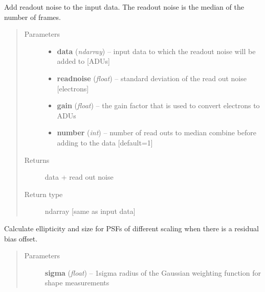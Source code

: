 \documentclass[a4paper,12pt,english]{sphinxmanual}
\begin{document}
\begin{fulllineitems}
\label{reduction:analysis.biasCalibration.addReadoutNoise}
Add readout noise to the input data. The readout noise is the median of the number of frames.
\begin{quote}\begin{description}
\item[{Parameters}] \leavevmode\begin{itemize}
\item {} 
\textbf{data} (\emph{ndarray}) -- input data to which the readout noise will be added to {[}ADUs{]}

\item {} 
\textbf{readnoise} (\emph{float}) -- standard deviation of the read out noise {[}electrons{]}

\item {} 
\textbf{gain} (\emph{float}) -- the gain factor that is used to convert electrons to ADUs

\item {} 
\textbf{number} (\emph{int}) -- number of read outs to median combine before adding to the data {[}default=1{]}

\end{itemize}

\item[{Returns}] \leavevmode
data + read out noise

\item[{Return type}] \leavevmode
ndarray {[}same as input data{]}

\end{description}\end{quote}

\end{fulllineitems}


\begin{fulllineitems}
\label{reduction:analysis.biasCalibration.findTolerableErrorPiston}
Calculate ellipticity and size for PSFs of different scaling when there is a residual
bias offset.
\begin{quote}\begin{description}
\item[{Parameters}] \leavevmode
\textbf{sigma} (\emph{float}) -- 1sigma radius of the Gaussian weighting function for shape measurements

\end{description}\end{quote}

\end{fulllineitems}
\end{document}
